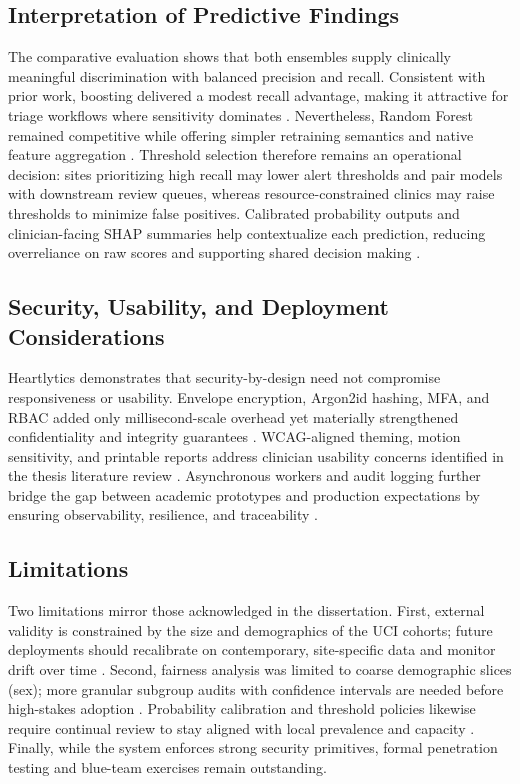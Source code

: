 \documentclass[12pt]{article}
\begin{document}
\subsection{Interpretation of Predictive Findings}
The comparative evaluation shows that both ensembles supply clinically meaningful discrimination with balanced precision and recall. Consistent with prior work, boosting delivered a modest recall advantage, making it attractive for triage workflows where sensitivity dominates \cite{chen2016xgboost}. Nevertheless, Random Forest remained competitive while offering simpler retraining semantics and native feature aggregation \cite{breiman2001random}. Threshold selection therefore remains an operational decision: sites prioritizing high recall may lower alert thresholds and pair models with downstream review queues, whereas resource-constrained clinics may raise thresholds to minimize false positives. Calibrated probability outputs and clinician-facing SHAP summaries help contextualize each prediction, reducing overreliance on raw scores and supporting shared decision making \cite{lundberg2017unified}.

\subsection{Security, Usability, and Deployment Considerations}
Heartlytics demonstrates that security-by-design need not compromise responsiveness or usability. Envelope encryption, Argon2id hashing, MFA, and RBAC added only millisecond-scale overhead yet materially strengthened confidentiality and integrity guarantees \cite{dworkin2007recommendation, biryukov2015argon2, ferraiolo2001proposed}. WCAG-aligned theming, motion sensitivity, and printable reports address clinician usability concerns identified in the thesis literature review \cite{w3c_wcag21, oshero2012improving}. Asynchronous workers and audit logging further bridge the gap between academic prototypes and production expectations by ensuring observability, resilience, and traceability \cite{howard2006security, celery}.

\subsection{Limitations}
Two limitations mirror those acknowledged in the dissertation. First, external validity is constrained by the size and demographics of the UCI cohorts; future deployments should recalibrate on contemporary, site-specific data and monitor drift over time \cite{mitchell2019model}. Second, fairness analysis was limited to coarse demographic slices (sex); more granular subgroup audits with confidence intervals are needed before high-stakes adoption \cite{barocas2019fairness}. Probability calibration and threshold policies likewise require continual review to stay aligned with local prevalence and capacity \cite{platt1999probabilistic}. Finally, while the system enforces strong security primitives, formal penetration testing and blue-team exercises remain outstanding.
\end{document}
